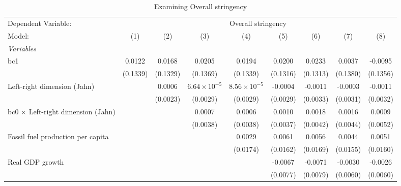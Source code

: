 
\begin{table}[htbp]
   \caption{Examining Overall stringency}
   \centering
   \begin{tabular}{lcccccccc}
      \tabularnewline \midrule \midrule
      Dependent Variable: & \multicolumn{8}{c}{Overall stringency}\\
      Model:                                    & (1)      & (2)      & (3)                   & (4)                   & (5)      & (6)      & (7)      & (8)\\  
      \midrule
      \emph{Variables}\\
      bc1                                       & 0.0122   & 0.0168   & 0.0205                & 0.0194                & 0.0200   & 0.0233   & 0.0037   & -0.0095\\   
                                                & (0.1339) & (0.1329) & (0.1369)              & (0.1339)              & (0.1316) & (0.1313) & (0.1380) & (0.1356)\\   
      Left-right dimension (Jahn)               &          & 0.0006   & $6.64\times 10^{-5}$  & $8.56\times 10^{-5}$  & -0.0004  & -0.0011  & -0.0003  & -0.0011\\   
                                                &          & (0.0023) & (0.0029)              & (0.0029)              & (0.0029) & (0.0033) & (0.0031) & (0.0032)\\   
      bc0 $\times$ Left-right dimension (Jahn)  &          &          & 0.0007                & 0.0006                & 0.0010   & 0.0018   & 0.0016   & 0.0009\\   
                                                &          &          & (0.0038)              & (0.0038)              & (0.0037) & (0.0042) & (0.0044) & (0.0052)\\   
      Fossil fuel production per capita         &          &          &                       & 0.0029                & 0.0061   & 0.0056   & 0.0044   & 0.0051\\   
                                                &          &          &                       & (0.0174)              & (0.0162) & (0.0169) & (0.0155) & (0.0160)\\   
      Real GDP growth                           &          &          &                       &                       & -0.0067  & -0.0071  & -0.0030  & -0.0026\\   
                                                &          &          &                       &                       & (0.0077) & (0.0079) & (0.0060) & (0.0060)\\   

\end{tabular}
\end{table}
